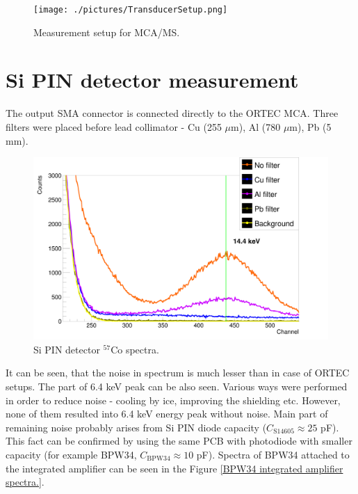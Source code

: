 \begin{figure}[H]
 \centering
 \texttt{[image: ./pictures/TransducerSetup.png]}
 \caption{Measurement setup for MCA/MS.}
 \label{meas setup}
 
\end{figure}

\section{Si PIN detector measurement}

The output SMA connector is connected directly to the ORTEC MCA.
Three filters were placed before lead collimator - Cu (255 $\mu$m), Al (780 $\mu$m), Pb (5 mm).

\begin{figure}[H]
 \centering
 \includegraphics[scale=0.125, angle = 0]{./pictures/SemiSpectre.png}
 \caption{Si PIN detector $^{57}$Co spectra.}
 \label{Si PIN detector spectra.}
\end{figure}


It can be seen, that the noise in spectrum is much lesser than in case of ORTEC setups. The part of 6.4 keV peak can be also seen. Various ways were performed in order to reduce noise - cooling by ice, improving the shielding etc. However, none of them resulted into 6.4 keV energy peak without noise. Main part of remaining noise probably arises from Si PIN diode capacity ($C_{\textrm{S14605}} \approx 25$ pF). This fact can be confirmed by using the same PCB with photodiode with smaller capacity (for example BPW34, $C_{\textrm{BPW34}} \approx 10$ pF). Spectra of BPW34 attached to the integrated amplifier can be seen in the Figure \ref{BPW34 integrated amplifier spectra.}.


